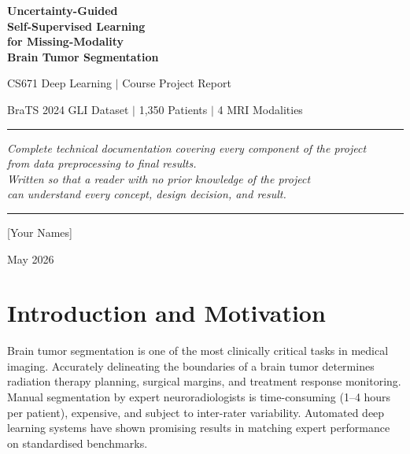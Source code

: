 \documentclass[12pt,a4paper]{article}
\begin{document}
\begin{titlepage}
\centering
\vspace*{1.5cm}
{\Huge\bfseries\color{mainblue}
  Uncertainty-Guided\\[6pt]
  Self-Supervised Learning\\[6pt]
  for Missing-Modality\\[6pt]
  Brain Tumor Segmentation
\par}
\vspace{1.2cm}
{\large\color{darkblue} CS671 Deep Learning $\mid$ Course Project Report\par}
\vspace{0.4cm}
{\normalsize BraTS 2024 GLI Dataset $\mid$ 1,350 Patients $\mid$ 4 MRI Modalities\par}
\vspace{1.5cm}
\hrule
\vspace{0.5cm}
{\normalsize\itshape
Complete technical documentation covering every component of the project\\
from data preprocessing to final results.\\
Written so that a reader with no prior knowledge of the project\\
can understand every concept, design decision, and result.
\par}
\vspace{0.5cm}
\hrule
\vfill
{\large [Your Names]\par}
{\normalsize May 2026\par}
\end{titlepage}

\tableofcontents
\newpage

\section{Introduction and Motivation}

Brain tumor segmentation is one of the most clinically critical tasks in medical imaging. Accurately delineating the boundaries of a brain tumor determines radiation therapy planning, surgical margins, and treatment response monitoring. Manual segmentation by expert neuroradiologists is time-consuming (1--4 hours per patient), expensive, and subject to inter-rater variability. Automated deep learning systems have shown promising results in matching expert performance on standardised benchmarks.
\end{document}
